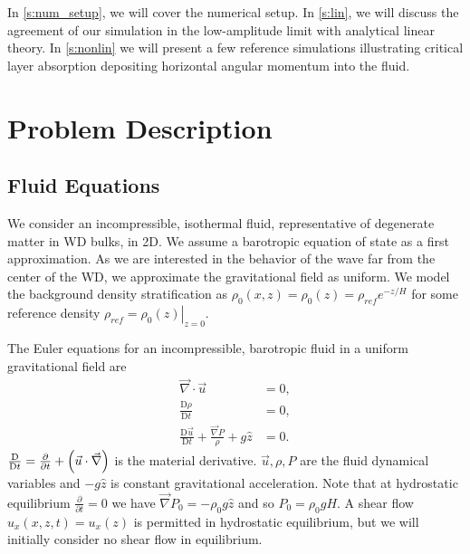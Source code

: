 \documentclass[twocolumn,
        nofootinbib,
        usenames, %
        dvipsnames %
    ]{revtex4-1}%
\newcommand*{\pd}[2]{\frac{\partial#1}{\partial#2}}
\newcommand*{\md}[2]{\frac{\mathrm{D}#1}{\mathrm{D}#2}}
\newcommand*{\at}[1]{\left.#1\right|}
\DeclarePairedDelimiter\p{\lparen}{\rparen}
\begin{document}

In \autoref{s:num_setup}, we will cover the numerical setup. In \autoref{s:lin}, we
will discuss the agreement of our simulation in the low-amplitude limit with
analytical linear theory. In \autoref{s:nonlin} we will present a few reference
simulations illustrating critical layer absorption depositing horizontal angular
momentum into the fluid.

\section{Problem Description}\label{s:num_setup}

\subsection{Fluid Equations}

We consider an incompressible, isothermal fluid, representative of degenerate
matter in WD bulks, in 2D. We assume a barotropic equation of state as a first
approximation. As we are interested in the behavior of the wave far from the
center of the WD, we approximate the gravitational field as uniform. We model
the background density stratification as $\rho_0(x, z) = \rho_0(z) = \rho_{ref}
e^{-z/H}$ for some reference density $\rho_{ref} = \at{\rho_0(z)}_{z = 0}$.

The Euler equations for an incompressible, barotropic fluid in a uniform
gravitational field are
\begin{subequations}\label{se:fc_orig}
    \begin{align}
        \vec{\nabla} \cdot \vec{u} &= 0,\\
        \md{\rho}{t} &= 0 ,\label{eq:fc_density}\\
        \md{\vec{u}}{t} + \frac{\vec{\nabla}P}{\rho} + g\hat{z} &= 0.
    \end{align}
\end{subequations}
$\md{}{t} = \pd{}{t} + \p*{\vec{u} \cdot \vec{\nabla}}$ is the material
derivative. $\vec{u}, \rho, P$ are the fluid dynamical variables and $-g\hat{z}$
is constant gravitational acceleration. Note that at hydrostatic equilibrium
$\pd{}{t} = 0$ we have $\vec{\nabla}P_0 = -\rho_0 g\hat{z}$ and so $P_0 = \rho_0
gH$. A shear flow $u_x(x, z, t) = u_x(z)$ is permitted in hydrostatic
equilibrium, but we will initially consider no shear flow in equilibrium.
\end{document}
